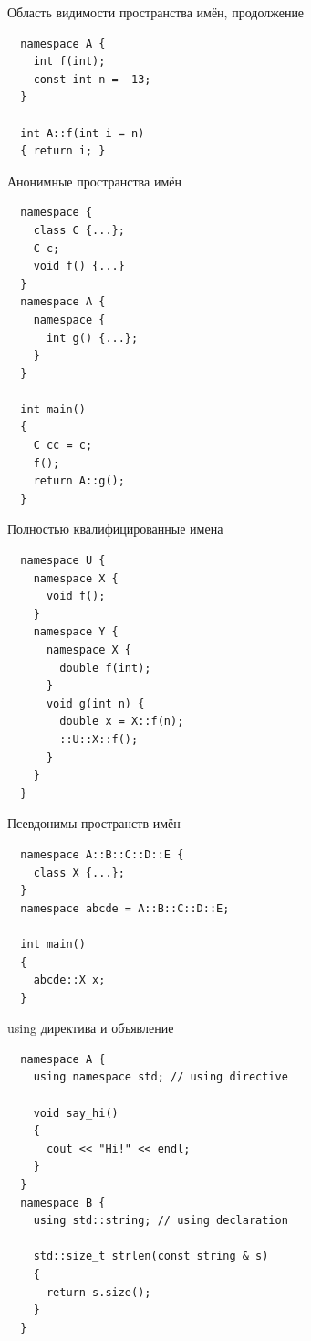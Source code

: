 \documentclass[unknownkeysallowed,xcolor=table]{beamer}
\begin{document}
\begin{frame}[fragile]{Область видимости пространства имён, продолжение}
  \begin{lstlisting}
  namespace A {
    int f(int);
    const int n = -13;
  }

  int A::f(int i = n)
  { return i; }
  \end{lstlisting}
\end{frame}

\begin{frame}[fragile]{Анонимные пространства имён}
  \begin{lstlisting}
  namespace {
    class C {...};
    C c;
    void f() {...}
  }
  namespace A {
    namespace {
      int g() {...};
    }
  }

  int main()
  {
    C cc = c;
    f();
    return A::g();
  }
  \end{lstlisting}
\end{frame}

\begin{frame}[fragile]{Полностью квалифицированные имена}
  \begin{lstlisting}
  namespace U {
    namespace X {
      void f();
    }
    namespace Y {
      namespace X {
        double f(int);
      }
      void g(int n) {
        double x = X::f(n);
        ::U::X::f();
      }
    }
  }
  \end{lstlisting}
\end{frame}

\begin{frame}[fragile]{Псевдонимы пространств имён}
  \begin{lstlisting}
  namespace A::B::C::D::E {
    class X {...};
  }
  namespace abcde = A::B::C::D::E;

  int main()
  {
    abcde::X x;
  }
  \end{lstlisting}
\end{frame}

\begin{frame}[fragile]{using директива и объявление}
  \begin{lstlisting}
  namespace A {
    using namespace std; // using directive

    void say_hi()
    {
      cout << "Hi!" << endl;
    }
  }
  namespace B {
    using std::string; // using declaration

    std::size_t strlen(const string & s)
    {
      return s.size();
    }
  }
  \end{lstlisting}
\end{frame}
\end{document}
